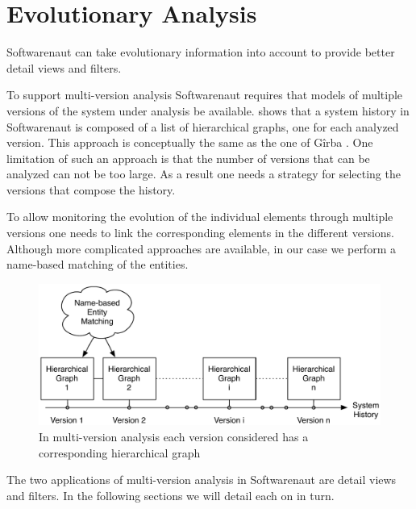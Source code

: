 \documentclass[preprint,12pt]{elsarticle}
\begin{document}
\section {Evolutionary Analysis}

Softwarenaut can take evolutionary information into account to provide better detail views and filters.

To support multi-version analysis Softwarenaut requires that models of multiple versions of the system under analysis be available.  shows that a system history in Softwarenaut is composed of a list of hierarchical graphs, one for each analyzed version. This approach is conceptually the same as the one of G{\^i}rba \cite{girba-thesis}. One limitation of such an approach is that the number of versions that can be analyzed can not be too large. As a result one needs a strategy for selecting the versions that compose the history.

To allow monitoring the evolution of the individual elements through multiple versions one needs to link the corresponding elements in the different versions. Although more complicated approaches are available, in our case we perform a name-based matching of the entities.

\begin{figure}[h]
\begin{center}
\includegraphics[width=\linewidth]{images/MultiVersionAnalysis}
\caption{In multi-version analysis each version considered has a corresponding hierarchical graph}
\end{center}
\end{figure}

The two applications of multi-version analysis in Softwarenaut are detail views and filters. In the following sections we will detail each on in turn.
\end{document}
